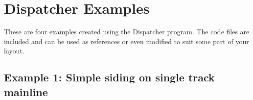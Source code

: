 
\chapter{Dispatcher Examples}
\label{chpt:dispatcher:Examples}

These are four examples created using the Dispatcher program.  The code
files are included and can be used as references or even modified to
suit some part of your layout.

\section{Example 1: Simple siding on single track mainline}

